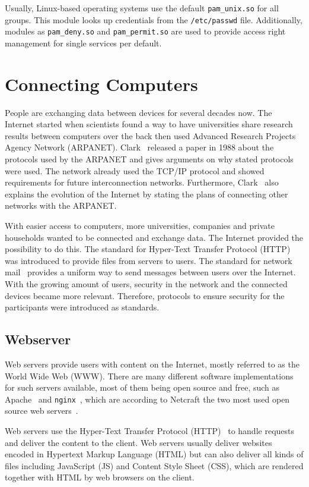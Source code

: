 Usually, Linux-based operating systems use the default \texttt{pam\_unix.so} for
all groups. This module looks up credentials from the \texttt{/etc/passwd} file.
Additionally, modules as \texttt{pam\_deny.so} and \texttt{pam\_permit.so} are
used to provide access right management for single services per default.

\section{Connecting Computers}

People are exchanging data between devices for several decades now. The Internet
started when scientists found a way to have universities share research results
between computers over the back then used Advanced Research Projects Agency
Network (ARPANET). Clark~\cite{arpanet} released a paper in 1988 about the
protocols used by the ARPANET and gives arguments on why stated protocols were
used. The network already used the TCP/IP protocol and showed requirements for
future interconnection networks. Furthermore, Clark~\cite{arpanet} also explains
the evolution of the Internet by stating the plans of connecting other networks
with the ARPANET.

With easier access to computers, more universities, companies and private
households wanted to be connected and exchange data. The Internet provided the
possibility to do this. The standard for Hyper-Text Transfer Protocol
(HTTP)~\cite{rfc7231} was introduced to provide files from servers to users. The
standard for network mail~\cite{rfc561} provides a uniform way to send messages
between users over the Internet. With the growing amount of users, security in
the network and the connected devices became more relevant. Therefore, protocols
to ensure security for the participants were introduced as standards.

\subsection{Webserver}

Web servers provide users with content on the Internet, mostly referred to as
the World Wide Web (WWW). There are many different software implementations for
such servers available, most of them being open source and free, such as
Apache~\cite{apacheweb} and \texttt{nginx}~\cite{nginxweb}, which are according
to Netcraft the two most used open source web servers~\cite{webserverpoll}.

Web servers use the Hyper-Text Transfer Protocol (HTTP)~\cite{rfc7231} to handle
requests and deliver the content to the client. Web servers usually deliver
websites encoded in Hypertext Markup Language (HTML) but can also deliver all
kinds of files including JavaScript (JS) and Content Style Sheet (CSS), which
are rendered together with HTML by web browsers on the client.

